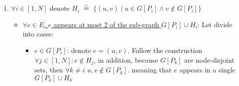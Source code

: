 \documentclass[11pt]{article}
\begin{document}
\begin{enumerate}
\begin{itemize}
        
         
        
        
        
    \end{itemize}
    
    \item 
    ${\forall i \in [1,N]}$ denote ${H_i}$ $\overset{\triangle}{=}$ $\{(u,v) \mid u \in G[P_i] \land  v \notin G[P_i] \}$
    \begin{itemize}
        \item \underline{$\forall e\in E$, $e$ appears at most 2 of the sub-graph $G[P_i]\cup H_i$}:
        \newline
        Let divide into cases:
        \begin{itemize}
            \item \underline{${e\in G[P_i]}$}:
            denote $e=(u,v)$. Follow the construction $\forall j\in[1,N]: e \notin H_j$, in addition, because $G[P_k]$ are node-disjoint sets, then $ \forall k \neq i$ $u,v \notin G[P_k]$. meaning that $e$ appears in a single $G[P_k] \cup H_k$
            

\end{itemize}
\end{itemize}
\end{enumerate}
\end{document}
